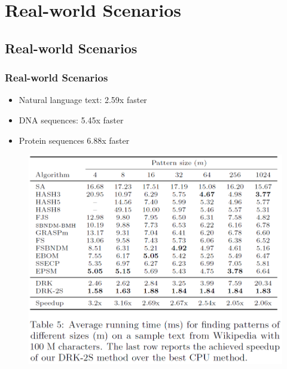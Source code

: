 \section{Real-world Scenarios}

\subsection{Real-world Scenarios}
\begin{frame}
	\frametitle{Real-world Scenarios}
	\begin{itemize}
		\setlength\itemsep{1em}
		\item Natural language text: 2.59x faster
		\item DNA sequences: 5.45x faster
		\item Protein sequences 6.88x faster
	\end{itemize}
\end{frame}	

\begin{frame}
	\begin{figure}
		\includegraphics[scale=0.40]{figure/fig-wiki.png}
	\end{figure}
\end{frame}

